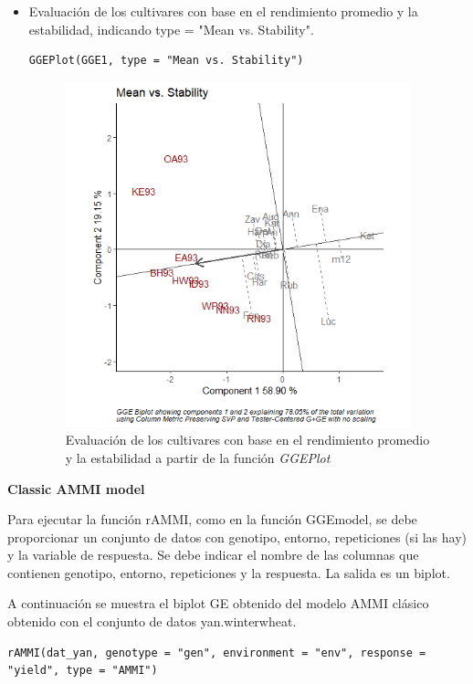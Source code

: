 \begin{itemize}
\item Evaluación de los cultivares con base en el rendimiento promedio y la estabilidad, indicando type = "Mean vs. Stability".

\begin{lstlisting}
GGEPlot(GGE1, type = "Mean vs. Stability")
\end{lstlisting}

\begin{figure}[h]
	\begin{center}
		\includegraphics[width=10cm]{./Graficos/MeanvsStability.png}
	\end{center}
	\caption{Evaluación de los cultivares con base en el rendimiento promedio y la estabilidad a partir de la función \emph{GGEPlot}}
\end{figure}

\end{itemize}


\textbf{Classic AMMI model}

Para ejecutar la función rAMMI, como en la función GGEmodel, se debe proporcionar un conjunto de datos con genotipo, entorno, repeticiones (si las hay) y la variable de respuesta. Se debe indicar el nombre de las columnas que contienen genotipo, entorno, repeticiones y la respuesta. La salida es un biplot.

A continuación se muestra el biplot GE obtenido del modelo AMMI clásico obtenido con el conjunto de datos yan.winterwheat.

\begin{lstlisting}
rAMMI(dat_yan, genotype = "gen", environment = "env", response = "yield", type = "AMMI")
\end{lstlisting}

